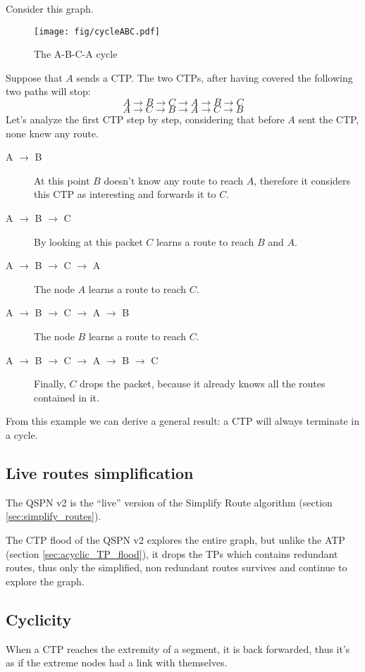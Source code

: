 \documentclass[a4paper]{article}
\begin{document}
Consider this graph.
\begin{figure}[h]
	\begin{center}
		\texttt{[image: fig/cycleABC.pdf]}
	\end{center}
	\caption{The A-B-C-A cycle}
	\label{fig:A-B-C-A}
\end{figure}
Suppose that $A$ sends a CTP. 
The two CTPs, after having covered the following two paths will stop:
\[
A \rightarrow B \rightarrow C \rightarrow A \rightarrow B \rightarrow C
\]
\[
A \rightarrow C \rightarrow B\rightarrow A \rightarrow C \rightarrow B
\]
Let's analyze the first CTP step by step, considering that before $A$ sent the
CTP, none knew any route.
\begin{description}
	\item[A $\rightarrow$ B] At this point $B$ doesn't know any route to
		reach $A$, therefore it considers this CTP as interesting and
		forwards it to $C$.
	\item[A $\rightarrow$ B $\rightarrow$ C] By looking at this packet $C$
		learns a route to reach $B$ and $A$.
	\item[A $\rightarrow$ B $\rightarrow$ C $\rightarrow$ A] The node $A$
		learns a route to reach $C$.
	\item[A $\rightarrow$ B $\rightarrow$ C $\rightarrow$ A $\rightarrow$
		B] The node $B$ learns a route to reach $C$.
	\item[A $\rightarrow$ B $\rightarrow$ C $\rightarrow$ A $\rightarrow$
		B $\rightarrow$ C] Finally, $C$ drops the packet, because it
		already knows all the routes contained in it.
\end{description}

From this example we can derive a general result: a CTP will always terminate
in a cycle.

\subsection{Live routes simplification}
The QSPN v2 is the ``live'' version of the Simplify Route algorithm (section
\ref{sec:simplify_routes}).

The CTP flood of the QSPN v2 explores the entire graph, but unlike the ATP
(section \ref{sec:acyclic_TP_flood}), it drops the TPs which contains
redundant routes, thus only the simplified, non redundant routes survives and
continue to explore the graph.

\newpage
\subsection{Cyclicity}
\label{sec:CTP_ciclicity}
When a CTP reaches the extremity of a segment, it is back forwarded, thus it's
as if the extreme nodes had a link with themselves.
\end{document}
